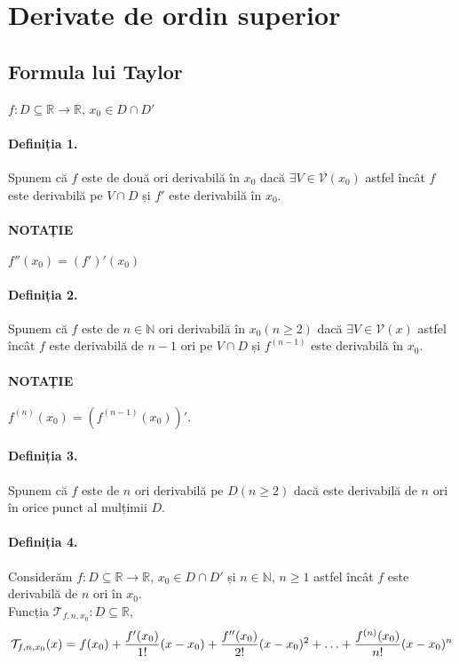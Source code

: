 \section{Derivate de ordin superior}
\subsection{Formula lui Taylor}
$f:D \subseteq \mathbb{R} \rightarrow \mathbb{R}$, $x_{0} \in D \cap D'$

\paragraph{Definiția 1.}
Spunem că $f$ este de două ori derivabilă în $x_{0}$ dacă $\exists V \in \mathcal{V}(x_{0})$ astfel încât $f$ este derivabilă pe $V \cap D$ și $f'$ este derivabilă în $x_{0}$.

\paragraph{NOTAȚIE}
$f''(x_{0}) = (f')'(x_{0})$

\paragraph{Definiția 2.}
Spunem că $f$ este de $n \in \mathbb{N}$ ori derivabilă în $x_{0} (n \geq 2)$ dacă $\exists V \in \mathcal{V}(x)$ astfel încât $f$ este derivabilă de $n-1$ ori pe $V \cap D$ și
$f^{(n-1)}$ este derivabilă în $x_{0}$.

\paragraph{NOTAȚIE}
$f^{(n)}(x_{0}) = (f^{(n-1)}(x_{0}))'$.

\paragraph{Definiția 3.}
Spunem că $f$ este de $n$ ori derivabilă pe $D (n \geq 2)$ dacă este derivabilă de $n$ ori în orice punct al mulțimii $D$.

\paragraph{Definiția 4.}
Considerăm $f:D \subseteq \mathbb{R} \rightarrow \mathbb{R}$, $x_{0} \in D \cap D'$ și $n \in \mathbb{N}$, $n \geq 1$
astfel încât $f$ este derivabilă de $n$ ori în $x_{0}$. \\
\indent Funcția $\mathcal{T}_{f, n, x_{0}}:D \subseteq \mathbb{R}$, \\
\begin{equation*}
\mathcal{T}_{f, n, x_{0}}(x) = f(x_{0}) + \displaystyle\frac{f'(x_{0})}{1!}(x - x_{0}) + \displaystyle\frac{f''(x_{0})}{2!}(x - x_{0})^{2} + \mathellipsis + 
\displaystyle\frac{f^{(n)}(x_{0})}{n!}(x - x_{0})^{n}
\end{equation*}

